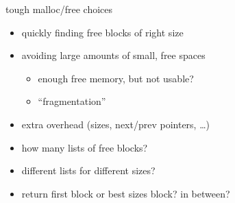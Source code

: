 \begin{frame}{tough malloc/free choices}
    \begin{itemize}
    \item quickly finding free blocks of right size
    \item avoiding large amounts of small, free spaces
        \begin{itemize}
        \item enough free memory, but not usable?
        \item ``fragmentation''
        \end{itemize}
    \item extra overhead (sizes, next/prev pointers, \ldots)
    \vspace{.5cm}
    \item how many lists of free blocks?
    \item different lists for different sizes?
    \item return first block or best sizes block? in between?
    \end{itemize}
\end{frame}
